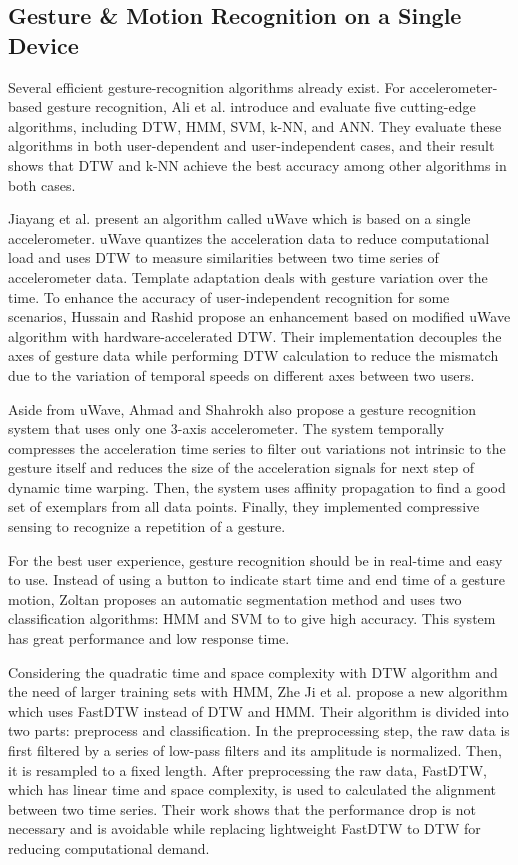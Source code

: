 
\subsection{Gesture \& Motion Recognition on a Single Device}

Several efficient gesture-recognition algorithms already exist. For accelerometer-based gesture recognition, Ali et al. \cite{Ali:2014} introduce and evaluate five cutting-edge algorithms, including \gls{DTW}, \gls{HMM}, \gls{SVM}, \gls{k-NN}, and \gls{ANN}. They evaluate these algorithms in both user-dependent and user-independent cases, and their result shows that \gls{DTW} and \gls{k-NN} achieve the best accuracy among other algorithms in both cases.

Jiayang et al. \cite{Liu:2009, LiuuWave} present an algorithm called uWave which is based on a single accelerometer. uWave quantizes the acceleration data to reduce computational load and uses \gls{DTW} to measure similarities between two time series of accelerometer data. Template adaptation deals with gesture variation over the time. To enhance the accuracy of user-independent recognition for some scenarios, Hussain and Rashid \cite{Hussain:2012} propose an enhancement based on modified uWave algorithm with hardware-accelerated DTW. Their implementation decouples the axes of gesture data while performing \gls{DTW} calculation to reduce the mismatch due to the variation of temporal speeds on different axes between two users. 

Aside from uWave, Ahmad and Shahrokh \cite{Ahmad:2010} also propose a gesture recognition system that uses only one 3-axis accelerometer. The system temporally compresses the acceleration time series to filter out variations not intrinsic to the gesture itself and reduces the size of the acceleration signals for next step of dynamic time warping. Then, the system uses affinity propagation to find a good set of exemplars from all data points. Finally, they implemented compressive sensing to recognize a repetition of a gesture. 

For the best user experience, gesture recognition should be in real-time and easy to use. Instead of using a button to indicate start time and end time of a gesture motion, Zoltan \cite{Zoltan} proposes an automatic segmentation method and uses two classification algorithms: \gls{HMM} and \gls{SVM} to to give high accuracy. This system has great performance and low response time.

Considering the quadratic time and space complexity with \gls{DTW} algorithm and the need of larger training sets with HMM, Zhe Ji et al. \cite{Ji:2015} propose a new algorithm which uses FastDTW instead of \gls{DTW} and \gls{HMM}. Their algorithm is divided into two parts: preprocess and classification. In the preprocessing step, the raw data is first filtered by a series of low-pass filters and its amplitude is normalized. Then, it is resampled to a fixed length. After preprocessing the raw data, FastDTW, which has linear time and space complexity, is used to calculated the alignment between two time series. Their work shows that the performance drop is not necessary and is avoidable while replacing lightweight FastDTW to \gls{DTW} for reducing computational demand.